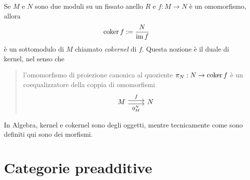 \begin{example}\label{example:CokernelInModR}
  Se \(M\) e \(N\) sono due moduli su un fissato anello \(R\) e
  \(f : M \to N\) è un omomorfismo, allora
  \[
    \operatorname{coker} f := \frac{N}{\operatorname{im} f}
  \]
  è un sottomodulo di \(M\) chiamato {\em cokernel} di \(f\). Questa
  nozione è il duale di kernel, nel senso che
  \begin{quotation}
    l'omomorfismo di proiezione canonica al quoziente
    \(\pi_N : N \to \operatorname{coker} f\) è un coequalizzatore della coppia di
    omomorfismi
    \[
      \begin{tikzcd}
        M \ar["f", shift left, r] \ar["{0_M^N}", shift right, swap, r]
        & N
      \end{tikzcd}
    \]
  \end{quotation}
\end{example}

\begin{remark}
  In Algebra, kernel e cokernel sono degli oggetti, mentre
  tecnicamente come sono definiti qui sono dei morfismi.
\end{remark}



\section{Categorie preadditive}

